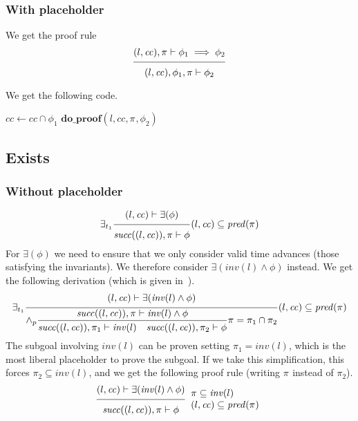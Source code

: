 \documentclass{article}
\newcommand{\proofrule}[3][]{#1 \frac{\raisebox{.7ex}{\normalsize{$#2$}}}
  {\raisebox{-1.0ex}{\normalsize{$#3$}}}}
\newcommand{\placeholder}[1][]{\pi_{#1}}
\newcommand{\loc}{l}
\newcommand{\region}{\mathit{cc}}
\newcommand{\suc}{\mathit{succ}}
\newcommand{\pre}{\mathit{pred}}
\newcommand{\inv}{\mathit{inv}}
\newcommand{\method}[1]{\ensuremath{\mathbf{#1}}}
\begin{document}
\subsubsection{With placeholder}

We get the proof rule
\[
\proofrule
{(\loc, \region), \placeholder \vdash \phi_1 \implies \phi_2}
{(\loc, \region), \phi_1, \placeholder \vdash \phi_2}
\]

We get the following code.
\begin{algorithm}[H]
  \caption{$\method{do\_proof\_place\_imply}(\loc, \region, \placeholder, \phi_1 \implies \phi_2)$}
  \begin{algorithmic}
  \STATE $\region \gets \region \cap \phi_1$
  \IF{$\region \neq \emptyset$}
    \STATE $\method{do\_proof}(\loc, \region, \placeholder, \phi_2)$
  \ENDIF
  \end{algorithmic}
\end{algorithm}

\subsection{Exists}

\subsubsection{Without placeholder}
\[
\proofrule[\exists_{t_1}]
{(\loc, \region) \vdash \exists(\phi)}
{\suc((\loc, \region)), \placeholder \vdash \phi}
(\loc, \region) \subseteq \pre(\placeholder)
\]
%
For $\exists(\phi)$ we need to ensure that we only consider valid time advances (those satisfying the invariants).
We therefore consider $\exists(\inv(\loc) \land \phi)$ instead.
We get the following derivation (which is given in~\cite[Appendix C.2]{FC:14}).
\[
\proofrule[\exists_{t_1}]
{(\loc, \region) \vdash \exists(\inv(\loc) \land \phi)}
{
  \proofrule[\land_p]
  {\suc((\loc, \region)), \placeholder \vdash \inv(\loc) \land \phi}
  {\suc((\loc, \region)), \placeholder[1] \vdash \inv(\loc)
  \quad \suc((\loc, \region)), \placeholder[2] \vdash \phi}
  \placeholder = \placeholder[1] \cap \placeholder[2]
}
(\loc, \region) \subseteq \pre(\placeholder)
\]
The subgoal involving $\inv(\loc)$ can be proven setting $\placeholder[1] = \inv(\loc)$, which is
the most liberal placeholder to prove the subgoal. If we take this simplification, this forces $\placeholder[2] \subseteq \inv(\loc)$,
and we get the following proof rule (writing $\placeholder$ instead of $\placeholder[2]$).
\[
\proofrule
{(\loc, \region) \vdash \exists(\inv(\loc) \land \phi)}
{\suc((\loc, \region)), \placeholder \vdash \phi}
\begin{array}{l}
\placeholder \subseteq \inv(\loc) \\
(\loc, \region) \subseteq \pre(\placeholder)
\end{array}
\]
\end{document}

